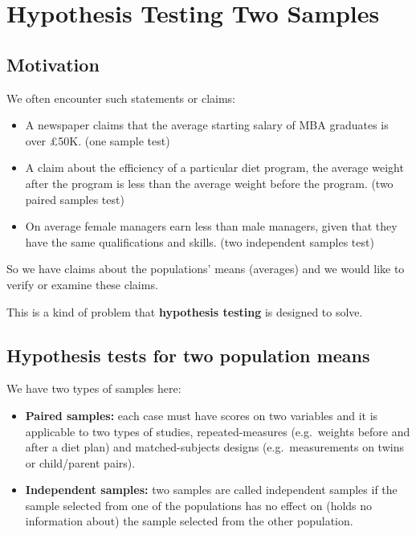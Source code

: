 \documentclass[
]{article}
\begin{document}
\hypertarget{hypothesis-testing-two-samples}{%
\section{Hypothesis Testing Two
Samples}\label{hypothesis-testing-two-samples}}

\hypertarget{motivation}{%
\subsection{Motivation}\label{motivation}}

We often encounter such statements or claims:

\begin{itemize}
\item
  A newspaper claims that the average starting salary of MBA graduates
  is over \pounds50K. (one sample test)
\item
  A claim about the efficiency of a particular diet program, the average
  weight after the program is less than the average weight before the
  program. (two paired samples test)
\item
  On average female managers earn less than male managers, given that
  they have the same qualifications and skills. (two independent samples
  test)
\end{itemize}

So we have claims about the populations' means (averages) and we would
like to verify or examine these claims.

This is a kind of problem that \textbf{hypothesis testing} is designed
to solve.

\hypertarget{hypothesis-tests-for-two-population-means}{%
\subsection{Hypothesis tests for two population
means}\label{hypothesis-tests-for-two-population-means}}

We have two types of samples here:

\begin{itemize}
\item
  \textbf{Paired samples:} each case must have scores on two variables
  and it is applicable to two types of studies, repeated-measures
  (e.g.~weights before and after a diet plan) and matched-subjects
  designs (e.g.~measurements on twins or child/parent pairs).
\item
  \textbf{Independent samples:} two samples are called independent
  samples if the sample selected from one of the populations has no
  effect on (holds no information about) the sample selected from the
  other population.
\end{itemize}
\end{document}
